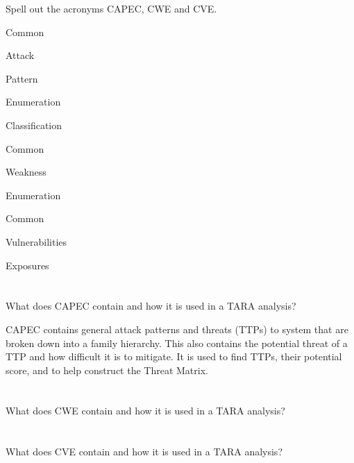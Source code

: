 \begin{questions}
\question{} Spell out the acronyms CAPEC, CWE and CVE.\@
  \begin{solution}
    \begin{description}[noitemsep]
    \item[C] Common
    \item[A] Attack
    \item[P] Pattern
    \item[E] Enumeration
    \item[C] Classification
    \end{description}

    \begin{description}[noitemsep]
    \item[C] Common
    \item[W] Weakness
    \item[E] Enumeration
    \end{description}

    \begin{description}[noitemsep]
    \item[C] Common
    \item[V] Vulnerabilities
    \item[E] Exposures
    \end{description}
  \end{solution}

  \begin{parts}
  \part{} What does CAPEC contain and how it is used in a TARA analysis?
    \begin{solution}
      CAPEC contains general attack patterns and threats (TTPs) to system that are broken down into a family hierarchy.
      This also contains the potential threat of a TTP and how difficult it is to mitigate.
      It is used to find TTPs, their potential score, and to help construct the Threat Matrix.
    \end{solution}

  \part{} What does CWE contain and how it is used in a TARA analysis?
  \part{} What does CVE contain and how it is used in a TARA analysis?
  \end{parts}


\end{questions}
